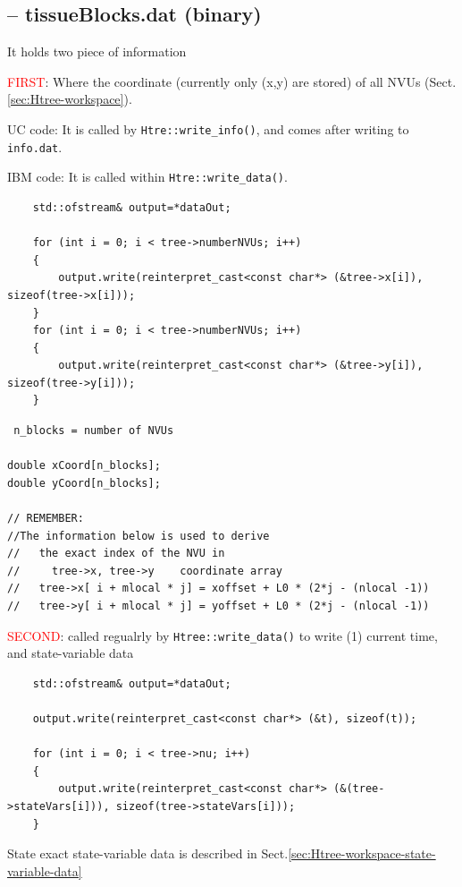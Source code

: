 \subsection{-- tissueBlocks.dat (binary)}

It holds two piece of information

\textcolor{red}{FIRST}: 
Where the coordinate (currently only (x,y) are stored) of all NVUs
(Sect.\ref{sec:Htree-workspace}).

UC code: It is called by \verb!Htre::write_info()!, and comes after writing to
\verb!info.dat!.

IBM code: It is called within \verb!Htre::write_data()!.

\begin{verbatim}
    std::ofstream& output=*dataOut;

    for (int i = 0; i < tree->numberNVUs; i++)
    {
        output.write(reinterpret_cast<const char*> (&tree->x[i]), sizeof(tree->x[i]));
    }
    for (int i = 0; i < tree->numberNVUs; i++)
    {
        output.write(reinterpret_cast<const char*> (&tree->y[i]), sizeof(tree->y[i]));
    }
\end{verbatim}

\begin{verbatim}
 n_blocks = number of NVUs

double xCoord[n_blocks];
double yCoord[n_blocks];

// REMEMBER:
//The information below is used to derive
//   the exact index of the NVU in 
//     tree->x, tree->y    coordinate array
//   tree->x[ i + mlocal * j] = xoffset + L0 * (2*j - (nlocal -1))
//   tree->y[ i + mlocal * j] = yoffset + L0 * (2*j - (nlocal -1))
\end{verbatim}


\textcolor{red}{SECOND}: called regualrly by \verb!Htree::write_data()! to write
(1) current time, and state-variable data
\begin{verbatim}
    std::ofstream& output=*dataOut;

    output.write(reinterpret_cast<const char*> (&t), sizeof(t));

    for (int i = 0; i < tree->nu; i++)
    {
        output.write(reinterpret_cast<const char*> (&(tree->stateVars[i])), sizeof(tree->stateVars[i]));
    }
\end{verbatim}
State exact state-variable data is described in Sect.\ref{sec:Htree-workspace-state-variable-data}


